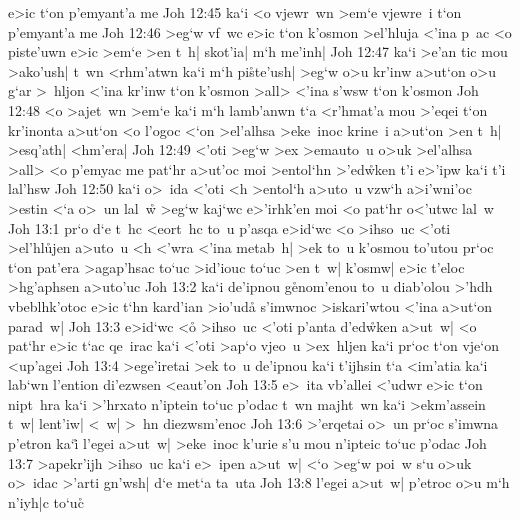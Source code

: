 e>ic
t`on
p'emyant'a
me\bibvsend
\vs Joh 12:45
ka`i
<o
vjewr~wn
>em`e
vjewre~i
t`on
p'emyant'a
me\bibvsend
\vs Joh 12:46
>eg`w
vf~wc
e>ic
t`on
k'osmon
>el'hluja
<'ina
p~ac
<o
piste'uwn
e>ic
>em`e
>en
t~h|
skot'ia|
m`h
me'inh|\bibvsend
\vs Joh 12:47
ka`i
>e'an
tic
mou
>ako'ush|
t~wn
<rhm'atwn
ka`i
m`h
pi\r{s}te'ush|
>eg`w
o>u
kr'inw
a>ut`on
o>u
g`ar
>~hljon
<'ina
kr'inw
t`on
k'osmon
>all>
<'ina
s'wsw
t`on
k'osmon\bibvsend
\vs Joh 12:48
<o
>ajet~wn
>em`e
ka`i
m`h
lamb'anwn
t`a
<r'hmat'a
mou
>'eqei
t`on
kr'inonta
a>ut`on
<o
l'ogoc
<`on
>el'alhsa
>eke~inoc
krine~i
a>ut`on
>en
t~h|
>esq'ath|
<hm'era|\bibvsend
\vs Joh 12:49
<'oti
>eg`w
>ex
>emauto~u
o>uk
>el'alhsa
>all>
<o
p'emyac
me
pat`hr
a>ut'oc
moi
>entol`hn
>'ed\r{w}ken
t'i
e>'ipw
ka`i
t'i
lal'hsw\bibvsend
\vs Joh 12:50
ka`i
o>~ida
<'oti
<h
>entol`h
a>uto~u
vzw`h
a>i'wni'oc
>estin
<`a
o>~un
lal~w\r{}
>eg`w
kaj`wc
e>'irhk'en
moi
<o
pat`hr
o<'utwc
lal~w\bibvsend
\vs Joh 13:1
pr`o
d`e
t~hc
<eort~hc
to~u
p'asqa
e>id`wc
<o
>ihso~uc
<'oti
>el'hl\r{u}jen
a>uto~u
<h
<'wra
<'ina
metab~h|
>ek
to~u
k'osmou
to'utou
pr`oc
t`on
pat'era
>agap'hsac
to`uc
>id'iouc
to`uc
>en
t~w|
k'osmw|
e>ic
t'eloc
>hg'aphsen
a>uto'uc\bibvsend
\vs Joh 13:2
ka`i
de'ipnou
g\r{e}nom'enou
to~u
diab'olou
>'hdh
vbeblhk'otoc
e>ic
t`hn
kard'ian
>io'uda\r{}
s'imwnoc
>iskari'wtou
<'ina
a>ut`on
parad~w|\bibvsend
\vs Joh 13:3
e>id`wc
<o\r{}
>ihso~uc
<'oti
p'anta
d'ed\r{w}ken
a>ut~w|
<o
pat`hr
e>ic
t`ac
qe~irac
ka`i
<'oti
>ap`o
vjeo~u
>ex~hljen
ka`i
pr`oc
t`on
vje`on
<up'agei\bibvsend
\vs Joh 13:4
>ege'iretai
>ek
to~u
de'ipnou
ka`i
t'ijhsin
t`a
<im'atia
ka`i
lab`wn
l'ention
di'ezwsen
<eaut'on\bibvsend
\vs Joh 13:5
e>~ita
vb'allei
<'udwr
e>ic
t`on
nipt~hra
ka`i
>'hrxato
n'iptein
to`uc
p'odac
t~wn
majht~wn
ka`i
>ekm'assein
t~w|
lent'iw|
<~w|
>~hn
diezwsm'enoc\bibvsend
\vs Joh 13:6
>'erqetai
o>~un
pr`oc
s'imwna
p'etron
ka`i\r{}
l'egei
a>ut~w|
>eke~inoc
k'urie
s'u
mou
n'ipteic
to`uc
p'odac\bibvsend
\vs Joh 13:7
>apekr'ijh
>ihso~uc
ka`i
e>~ipen
a>ut~w|
<`o
>eg`w
poi~w
s`u
o>uk
o>~idac
>'arti
gn'wsh|
d`e
met`a
ta~uta\bibvsend
\vs Joh 13:8
l'egei
a>ut~w|
p'etroc
o>u
m`h
n'iyh|c
to`uc\r{}
